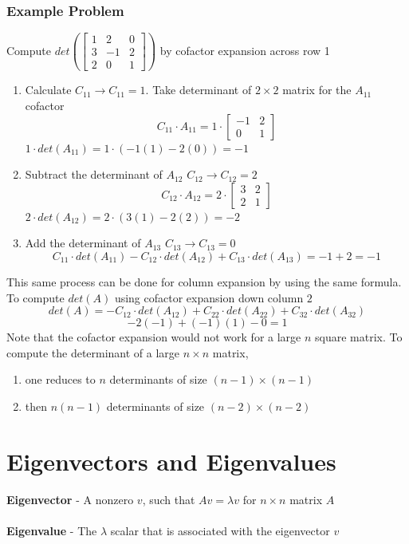 \begin{enumerate}
\subsubsection{Example Problem}
Compute $det(\begin{bmatrix}1 & 2 & 0 \\ 3 & -1 & 2 \\ 2 & 0 & 1 
\end{bmatrix})$ by cofactor expansion across row 1 
\begin{enumerate}
  \item Calculate $C_{11} \rightarrow C_{11} = 1$. Take determinant 
    of $2 \times 2$ matrix for the $A_{11}$ cofactor 
    \[
      C_{11} \cdot A_{11} = 1 \cdot \begin{bmatrix}
        -1 & 2 \\
        0 & 1 
      \end{bmatrix}
    \]
    $1 \cdot det(A_{11}) = 1 \cdot (-1(1) - 2(0)) = -1$
  \item Subtract the determinant of $A_{12}$ \cdot $C_{12} \rightarrow 
    C_{12} = 2$
    \[
      C_{12} \cdot A_{12} = 2 \cdot \begin{bmatrix}
        3 & 2 \\
        2 & 1 
      \end{bmatrix}
    \]
    $2 \cdot det(A_{12}) = 2 \cdot (3(1) - 2(2)) = -2$
  \item Add the determinant of $A_{13}$ \cdot $C_{13} \rightarrow 
    C_{13} = 0$ 
\[
    C_{11} \cdot det(A_{11}) - C_{12} \cdot det(A_{12}) 
    + C_{13} \cdot det(A_{13}) = -1 + 2 = -1
\]
\end{enumerate}
This same process can be done for column expansion by using the 
same formula. To compute $det(A)$ using cofactor expansion down 
column $2$ 
\[
  det(A) = -C_{12} \cdot det(A_{12}) + C_{22} \cdot det(A_{22}) 
  + C_{32} \cdot det(A_{32}) 
\]
\[
  -2(-1) + (-1)(1) - 0 = 1
\]
Note that the cofactor expansion would not work for a large $n$ square 
matrix. To compute the determinant of a large $n \times n$ matrix, 
\begin{enumerate}
  \item one reduces to $n$ determinants of size 
    $(n - 1) \times (n - 1)$
  \item then $n(n - 1)$ determinants of size 
    $(n - 2) \times (n - 2)$
\end{enumerate}
\section{Eigenvectors and Eigenvalues}
\textbf{Eigenvector} - A nonzero $v$, such that $Av = \lambda v$ for 
$n \times n$ matrix $A$ \\\\
\textbf{Eigenvalue} - The $\lambda$ scalar that is associated with
the eigenvector $v$

\end{enumerate}
